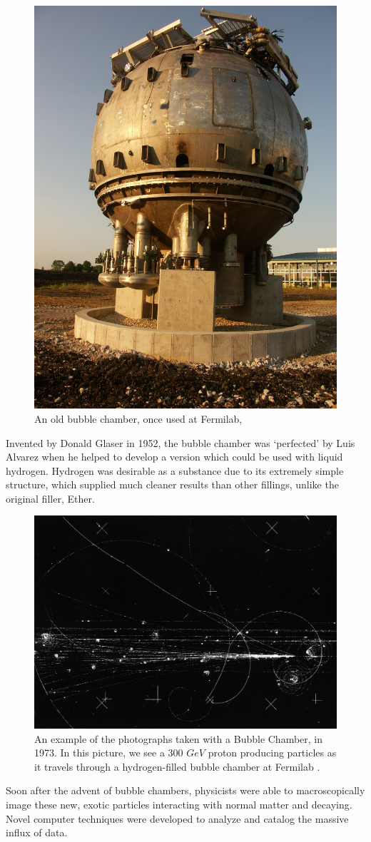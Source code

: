 \begin{figure}[ht]
	\centering
	\includegraphics[width=0.5\linewidth]{./figures/bubblechamberfnal.jpg}
	\caption{An old bubble chamber, once used at Fermilab,
	 \cite{FNALBubbleChamber2005}}
	\label{fig:bubble_chamber}
\end{figure}

Invented by Donald Glaser in 1952, the bubble chamber was `perfected' by Luis
Alvarez when he helped to develop a version which could be used with liquid
hydrogen. Hydrogen was desirable as a substance due to its extremely simple
structure, which supplied much cleaner results than other fillings, unlike the
original filler, Ether.

\begin{figure}[ht]
	\centering
	\includegraphics[width=0.5\linewidth]{./figures/bubble_chamber_tracks.jpg}
	\caption{
		An example of the photographs taken with a Bubble Chamber, in 1973.
		In this picture, we see a 300 $GeV$ proton producing particles as it travels
		through a hydrogen-filled bubble chamber at Fermilab  \cite{HD6B235}.
	}
	\label{fig:bubble_tracks}
\end{figure}

Soon after the advent of bubble chambers, physicists were able to
macroscopically image these new, exotic particles interacting with normal matter
and decaying. Novel computer techniques were developed to analyze and catalog
the massive influx of data.

